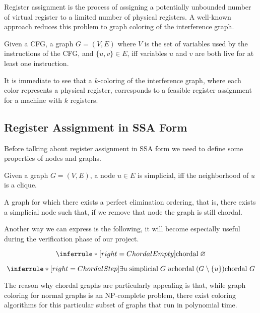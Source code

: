 Register assignment is the process of assigning a potentially unbounded number of virtual register to a limited number of physical registers. A well-known approach reduces this problem to graph coloring of the interference graph.

\begin{definition}\label{def:ig}
    Given a CFG, a graph $G = (V, E)$ where $V$ is the set of variables used by the instructions of the CFG, and $\{ u, v \} \in E$, iff variables $u$ and $v$ are both live for at least one instruction.
\end{definition}

It is immediate to see that a $k$-coloring of the interference graph, where each color represents a physical register, corresponds to a feasible register assignment for a machine with $k$ registers.

\subsection{Register Assignment in SSA Form}
\label{subsec:ssara}

Before talking about register assignment in SSA form we need to define some properties of nodes and graphs.

\begin{definition}\label{def:simplicial}
    Given a graph $G = (V, E)$, a node $u \in E$ is simplicial, iff the neighborhood of $u$ is a clique.
\end{definition}

\begin{definition}\label{def:chordal}
    A graph for which there exists a perfect elimination ordering, that is, there exists a simplicial node such that, if we remove that node the graph is still chordal.
\end{definition}

Another way we can express  is the following, it will become especially useful during the verification phase of our project.

\[
\inferrule*[right=ChordalEmpty]{
}{
    \text{chordal} \; \varnothing
}
\]

\[
\inferrule*[right=ChordalStep]{
    \exists u \; \text{simplicial} \; G \; u \\
    \text{chordal} \; (G \setminus \{ u \})
}{
    \text{chordal } G
}
\]

The reason why chordal graphs are particularly appealing is that, while graph coloring for normal graphs is an NP-complete problem, there exist coloring algorithms for this particular subset of graphs that run in polynomial time.

